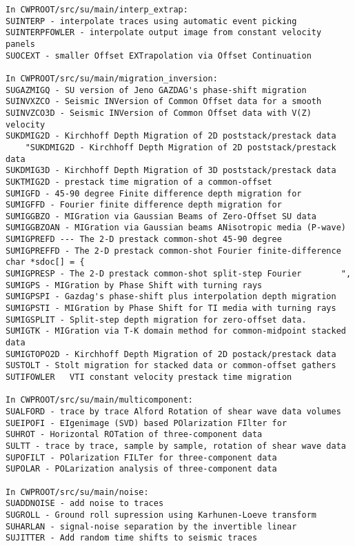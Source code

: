{{\begin{verbatim}
In CWPROOT/src/su/main/interp_extrap:
SUINTERP - interpolate traces using automatic event picking		
SUINTERPFOWLER - interpolate output image from constant velocity panels
SUOCEXT - smaller Offset EXTrapolation via Offset Continuation        

In CWPROOT/src/su/main/migration_inversion:
SUGAZMIGQ - SU version of Jeno GAZDAG's phase-shift migration 	
SUINVXZCO - Seismic INVersion of Common Offset data for a smooth 	
SUINVZCO3D - Seismic INVersion of Common Offset data with V(Z) velocity
SUKDMIG2D - Kirchhoff Depth Migration of 2D poststack/prestack data	
	"SUKDMIG2D - Kirchhoff Depth Migration of 2D poststack/prestack data	
SUKDMIG3D - Kirchhoff Depth Migration of 3D poststack/prestack data	
SUKTMIG2D - prestack time migration of a common-offset	
SUMIGFD - 45-90 degree Finite difference depth migration for		
SUMIGFFD - Fourier finite difference depth migration for		
SUMIGGBZO - MIGration via Gaussian Beams of Zero-Offset SU data	
SUMIGGBZOAN - MIGration via Gaussian beams ANisotropic media (P-wave)	
SUMIGPREFD --- The 2-D prestack common-shot 45-90 degree		
SUMIGPREFFD - The 2-D prestack common-shot Fourier finite-difference	
char *sdoc[] = {
SUMIGPRESP - The 2-D prestack common-shot split-step Fourier		", 
SUMIGPS - MIGration by Phase Shift with turning rays			
SUMIGPSPI - Gazdag's phase-shift plus interpolation depth migration   
SUMIGPSTI - MIGration by Phase Shift for TI media with turning rays	
SUMIGSPLIT - Split-step depth migration for zero-offset data.         
SUMIGTK - MIGration via T-K domain method for common-midpoint stacked data
SUMIGTOPO2D - Kirchhoff Depth Migration of 2D postack/prestack data	
SUSTOLT - Stolt migration for stacked data or common-offset gathers	
SUTIFOWLER   VTI constant velocity prestack time migration		

In CWPROOT/src/su/main/multicomponent:
SUALFORD - trace by trace Alford Rotation of shear wave data volumes  
SUEIPOFI - EIgenimage (SVD) based POlarization FIlter for             
SUHROT - Horizontal ROTation of three-component data			
SULTT - trace by trace, sample by sample, rotation of shear wave data 
SUPOFILT - POlarization FILTer for three-component data               
SUPOLAR - POLarization analysis of three-component data               

In CWPROOT/src/su/main/noise:
SUADDNOISE - add noise to traces					
SUGROLL - Ground roll supression using Karhunen-Loeve transform	
SUHARLAN - signal-noise separation by the invertible linear		
SUJITTER - Add random time shifts to seismic traces			


\end{verbatim}}}
